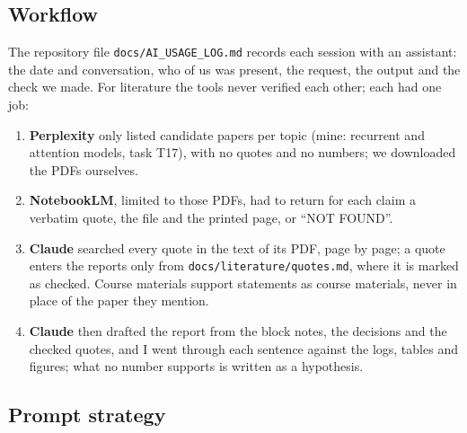 \label{app:ai}

\subsection*{Workflow}

The repository file \texttt{docs/AI\_USAGE\_LOG.md} records each session with an assistant: the date and
conversation, who of us was present, the request, the output and the check we made. For literature the
tools never verified each other; each had one job:
\begin{enumerate}[leftmargin=1.4em,itemsep=1pt]
  \item \textbf{Perplexity} only listed candidate papers per topic (mine: recurrent and attention models,
        task T17), with no quotes and no numbers; we downloaded the PDFs ourselves.
  \item \textbf{NotebookLM}, limited to those PDFs, had to return for each claim a verbatim quote, the file
        and the printed page, or ``NOT FOUND''.
  \item \textbf{Claude} searched every quote in the text of its PDF, page by page; a quote enters the
        reports only from \texttt{docs/literature/quotes.md}, where it is marked as checked. Course
        materials support statements as course materials, never in place of the paper they mention.
  \item \textbf{Claude} then drafted the report from the block notes, the decisions and the checked quotes,
        and I went through each sentence against the logs, tables and figures; what no number supports is
        written as a hypothesis.
\end{enumerate}

\subsection*{Prompt strategy}

